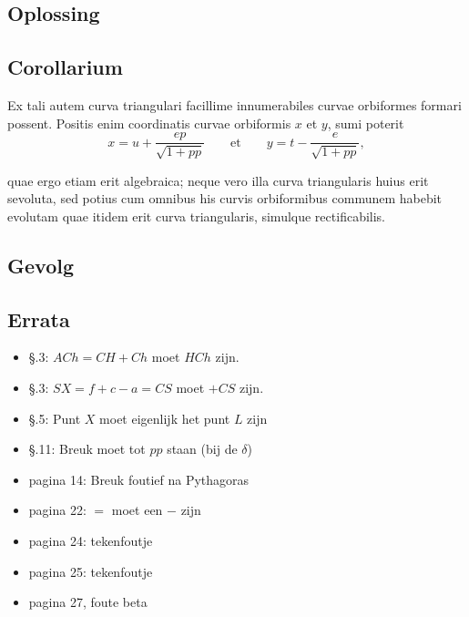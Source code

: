 \documentclass[10pt,a4paper]{article}
\begin{document}
\begin{paracol}{2}
	\switchcolumn
	\subsection*{Oplossing}
	\switchcolumn*
	
	\subsection*{Corollarium}
	\par Ex tali autem curva triangulari facillime innumerabiles curvae orbiformes formari possent. Positis enim coordinatis curvae orbiformis $x$ et $y$, sumi poterit
	\[
		x=u+\dfrac{ep}{\sqrt{1+pp}} \qquad \text{et} \qquad y=t-\dfrac{e}{\sqrt{1+pp}},
	\]
	\par quae ergo etiam erit algebraica; neque vero illa curva triangularis huius erit sevoluta, sed potius cum omnibus his curvis orbiformibus communem  habebit evolutam quae itidem erit curva triangularis, simulque rectificabilis.

	\switchcolumn
	\subsection*{Gevolg}
	\switchcolumn*

	\end{paracol}
\newpage

\subsection*{Errata}

\begin{itemize}
	\item \S.3: $ACh = CH+Ch$ moet $HCh$ zijn.
	\item \S.3: $SX = f+c-a = CS$ moet $+CS$ zijn.
	\item \S.5: Punt $X$ moet eigenlijk het punt $L$ zijn
	\item \S.11: Breuk moet tot $pp$ staan (bij de $\delta$)
	\item pagina 14: Breuk foutief na Pythagoras
	\item pagina 22: $=$ moet een $-$ zijn
	\item pagina 24: tekenfoutje
	\item pagina 25: tekenfoutje
	\item pagina 27, foute beta
\end{itemize} 
\end{document}
